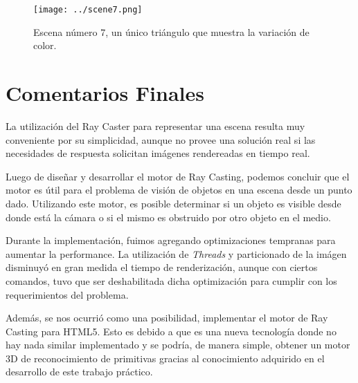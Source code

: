 \documentclass[a4paper,10pt]{article}
\begin{document}
\begin{figure}[h]
 \centering
 \texttt{[image: ../scene7.png]}
 \caption{Escena n\'umero 7, un \'unico tri\'angulo que muestra la variaci\'on de color.}
 \label{fig:7}
\end{figure}

\section{Comentarios Finales}

La utilizaci\'on del Ray Caster para representar una escena resulta muy conveniente por su simplicidad, aunque no provee una soluci\'on real
si las necesidades de respuesta solicitan im\'agenes rendereadas en tiempo real.

Luego de dise\~nar y desarrollar el motor de Ray Casting, podemos concluir que el motor es \'util para el problema de visi\'on de objetos en una escena desde un punto dado.  Utilizando este motor, es posible determinar si un objeto es visible desde donde est\'a la c\'amara o si el mismo es obstruido por otro objeto en el medio.

Durante la implementaci\'on, fuimos agregando optimizaciones tempranas para aumentar la performance. La utilizaci\'on de \emph{Threads} y
particionado de la im\'agen disminuy\'o en gran medida el tiempo de renderizaci\'on, aunque con ciertos comandos, tuvo que ser deshabilitada dicha
optimizaci\'on para cumplir con los requerimientos del problema.

Adem\'as, se nos ocurri\'o como una posibilidad, implementar el motor de Ray Casting para HTML5.  Esto es debido a que es una nueva tecnolog\'ia donde no hay nada similar implementado y se podr\'ia, de manera simple, obtener un motor 3D de reconocimiento de primitivas gracias al conocimiento adquirido en el desarrollo de este trabajo pr\'actico.
\end{document}

